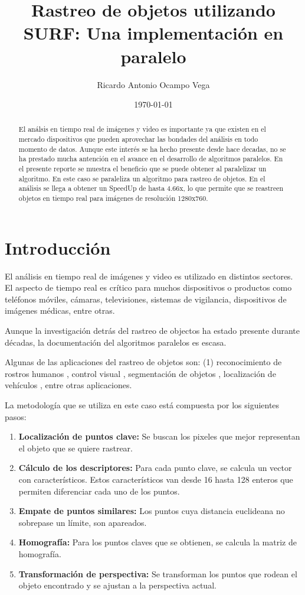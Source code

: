 \documentclass[a4paper]{article}
\title{Rastreo de objetos utilizando SURF: Una implementación en paralelo}
\author{Ricardo Antonio Ocampo Vega}
\date{\today}
\begin{document}
\maketitle


\begin{abstract}
El análsis en tiempo real de imágenes y video es importante ya que existen en el mercado dispositivos que pueden aprovechar las bondades del análisis en todo momento de datos. Aunque este interés se ha hecho presente desde hace decadas, no se ha prestado mucha antención en el avance en el desarrollo de algoritmos paralelos. En el presente reporte se muestra el beneficio que se puede obtener al paralelizar un algoritmo. En este caso se paraleliza un algoritmo para rastreo de objetos. En el análisis se llega a obtener un SpeedUp de hasta 4.66x, lo que permite que se reastreen objetos en tiempo real para imágenes de resolución 1280x760.
\end{abstract}

\section{Introducción}
El análisis en tiempo real de imágenes y video es utilizado en distintos sectores. El aspecto de tiempo real es crítico para muchos dispositivos o productos como teléfonos móviles, cámaras, televisiones, sistemas de vigilancia, dispositivos de imágenes médicas, entre otras.

Aunque la investigación detrás del rastreo de objectos ha estado presente durante décadas, la documentación del algoritmos paralelos es escasa.  

Algunas de las aplicaciones del rastreo de objetos son: (1) reconocimiento de rostros humanos \cite{5374808}, control visual \cite{6417913}, segmentación de objetos \cite{6466854}, localización de vehículos \cite{6469511}, entre otras aplicaciones.

La metodología que se utiliza en este caso está compuesta por los siguientes pasos: 
\begin{enumerate}
   \item \textbf{Localización de puntos clave:} Se buscan los pixeles que mejor representan el objeto que se quiere rastrear.
   \item \textbf{Cálculo de los descriptores:} Para cada punto clave, se calcula un vector con característicos. Estos característicos van desde 16 hasta 128 enteros que permiten diferenciar cada uno de los puntos.
   \item \textbf{Empate de puntos similares:} Los puntos cuya distancia euclideana no sobrepase un límite, son apareados.
   \item \textbf{Homografía:} Para los puntos claves que se obtienen, se calcula la matriz de homografía. 
   \item \textbf{Transformación de perspectiva:} Se transforman los puntos que rodean el objeto encontrado y se ajustan a la perspectiva actual.
\end{enumerate}
\end{document}
